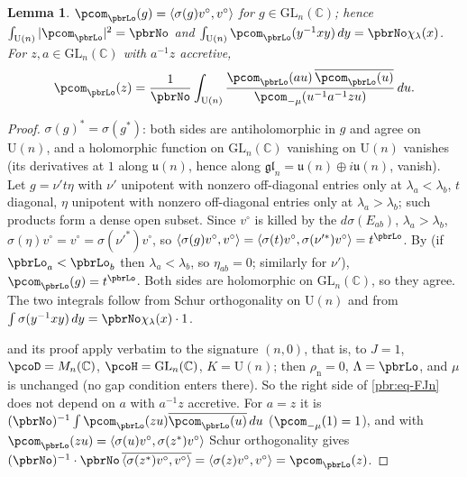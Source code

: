 \documentclass[10pt]{amsart}
\newtheorem{lemma}[theorem]{Lemma}
\theoremstyle{definition}
\theoremstyle{remark}
\newcommand{\C}{\mathbb C}
\providecommand{\auU}{\mathrm U}
\providecommand{\aubar}[1]{\overline{#1}}
\begin{document}
\begin{lemma}\label{pbr:hw}
$\pcom_{\pbrLo}(g)=\langle\sigma(g)v^\circ,v^\circ\rangle$ for $g\in\mathrm{GL}_n(\C)$; hence
$\int_{\auU(n)}|\pcom_{\pbrLo}|^2=\pbrNo$ and $\int_{\auU(n)}\pcom_{\pbrLo}(y^{-1}xy)\,dy=\pbrNo
\chi_\lambda(x)$. For $z,a\in\mathrm{GL}_n(\C)$ with $a^{-1}z$ accretive,
\begin{equation}\label{pbr:eq-FJn}
\pcom_{\pbrLo}(z)=\frac1{\pbrNo}\int_{\auU(n)}\frac{\pcom_{\pbrLo}(au)\,\aubar{\pcom_{\pbrLo}(u)}}
{\pcom_{-\mu}(u^{-1}a^{-1}zu)}\,du .
\end{equation}
\end{lemma}
\begin{proof}
$\sigma(g)^*=\sigma(g^*)$: both sides are antiholomorphic in $g$ and agree on $\auU(n)$, and a
holomorphic function on $\mathrm{GL}_n(\C)$ vanishing on $\auU(n)$ vanishes (its derivatives at $1$
along $\mathfrak u(n)$, hence along $\mathfrak{gl}_n=\mathfrak u(n)\oplus i\mathfrak u(n)$, vanish).
Let $g=\nu't\eta$ with $\nu'$ unipotent with nonzero off-diagonal entries only at $\lambda_a<
\lambda_b$, $t$ diagonal, $\eta$ unipotent with nonzero off-diagonal entries only at $\lambda_a>
\lambda_b$; such products form a dense open subset. Since $v^\circ$ is killed by the $d\sigma(E_{ab})$,
$\lambda_a>\lambda_b$, $\sigma(\eta)v^\circ=v^\circ=\sigma(\nu'^*)v^\circ$, so $\langle\sigma(g)v^\circ,
v^\circ\rangle=\langle\sigma(t)v^\circ,\sigma(\nu'^*)v^\circ\rangle=t^{\pbrLo}$. By
{\cite[Lemma~3.18(b)]{P49}} (if $\pbrLo_a<\pbrLo_b$ then $\lambda_a<\lambda_b$, so $\eta_{ab}=0$;
similarly for $\nu'$), $\pcom_{\pbrLo}(g)=t^{\pbrLo}$. Both sides are holomorphic on
$\mathrm{GL}_n(\C)$, so they agree. The two integrals follow from Schur orthogonality on $\auU(n)$ and
from $\int\sigma(y^{-1}xy)\,dy=\pbrNo\chi_\lambda(x)\cdot1$.

{\cite[Proposition~3.21]{P49}} and its proof apply verbatim to the signature $(n,0)$, that is, to $J=1$,
$\pcoD=M_n(\C)$, $\pcoH=\mathrm{GL}_n(\C)$, $K=\auU(n)$; then $\rho_{\mathrm n}=0$, $\Lambda=\pbrLo$,
and $\mu$ is unchanged (no gap condition enters there). So the right side of \eqref{pbr:eq-FJn} does
not depend on $a$ with $a^{-1}z$ accretive. For $a=z$ it is $(\pbrNo)^{-1}\int\pcom_{\pbrLo}(zu)
\aubar{\pcom_{\pbrLo}(u)}\,du$ ($\pcom_{-\mu}(1)=1$), and with $\pcom_{\pbrLo}(zu)=\langle\sigma(u)
v^\circ,\sigma(z^*)v^\circ\rangle$ Schur orthogonality gives $(\pbrNo)^{-1}\cdot\pbrNo\,\aubar{\langle
\sigma(z^*)v^\circ,v^\circ\rangle}=\langle\sigma(z)v^\circ,v^\circ\rangle=\pcom_{\pbrLo}(z)$.
\end{proof}
\end{document}

